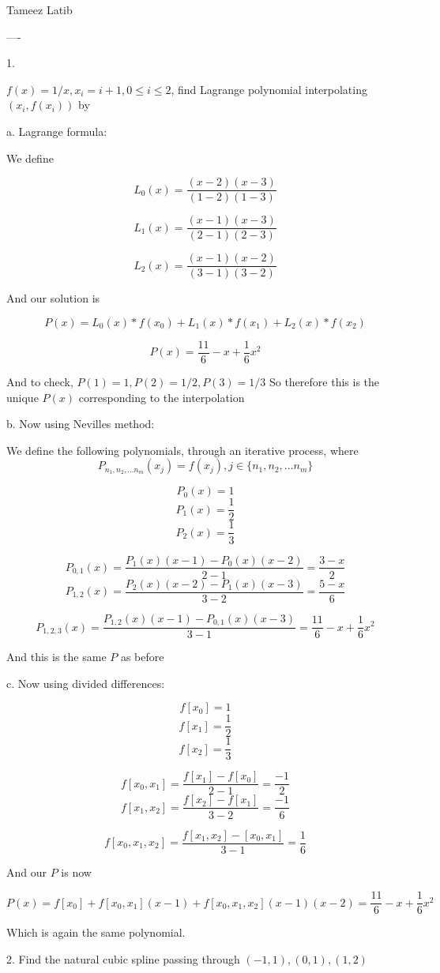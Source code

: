 \documentclass{article}
\begin{document}
Tameez Latib


----

1. 

$f(x) = 1/x, x_i = i + 1, 0 \le i \le 2$, find Lagrange polynomial interpolating $(x_i, f(x_i))$ by

a. Lagrange formula:

We define 

$$L_0(x) = \frac{(x-2)(x-3)}{(1-2)(1-3)}$$

$$L_1(x) = \frac{(x-1)(x-3)}{(2-1)(2-3)}$$

$$L_2(x) = \frac{(x-1)(x-2)}{(3-1)(3-2)}$$

And our solution is 

$$P(x) = L_0(x)*f(x_0) + L_1(x)*f(x_1)  + L_2(x)*f(x_2)$$

$$P(x) = \frac{11}{6} - x + \frac{1}{6}x^2$$

And to check, $P(1) = 1, P(2) = 1/2, P(3) = 1/3$ So therefore this is the unique $P(x)$ corresponding to the interpolation


b. Now using Nevilles method: 

We define the following polynomials, through an iterative process, where $$P_{n_1, n_2, ... n_m}(x_j) = f(x_j),  j \in \{n_1, n_2, ... n_m\} $$

$$P_{0}(x) = 1$$
$$P_{1}(x) = \frac{1}{2}$$
$$P_{2}(x) = \frac{1}{3}$$

$$P_{0,1}(x) = \frac{P_{1}(x)(x-1) - P_{0}(x)(x-2) }{2-1} = \frac{3-x}{2}$$
$$P_{1,2}(x) = \frac{P_{2}(x)(x-2) - P_{1}(x)(x-3) }{3-2} = \frac{5-x}{6}$$

$$P_{1,2,3}(x) = \frac{P_{1,2}(x)(x-1) - P_{0,1}(x)(x-3) }{3-1} = \frac{11}{6} - x + \frac{1}{6}x^2$$

And this is the same $P$ as before

c. Now using divided differences:

$$f[x_0] = 1$$
$$f[x_1] = \frac{1}{2}$$
$$f[x_2] = \frac{1}{3}$$

$$f[x_0, x_1] = \frac{f[x_1] - f[x_0]}{2-1} = \frac{-1}{2}$$
$$f[x_1, x_2] =  \frac{f[x_2] - f[x_1]}{3-2} = \frac{-1}{6}$$

$$f[x_0, x_1, x_2] =  \frac{f[x_1, x_2]- [x_0, x_1]}{3-1} = \frac{1}{6}$$

And our $P$ is now

$$P(x) = f[x_0] + f[x_0, x_1] (x-1)+ f[x_0, x_1, x_2] (x-1) (x-2) = \frac{11}{6} - x + \frac{1}{6}x^2$$

Which is again the same polynomial.

2. Find the natural cubic spline passing through $(-1, 1) , (0, 1), (1, 2)$
\end{document}
